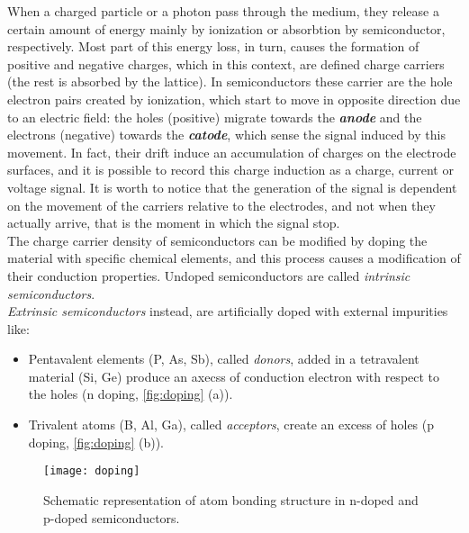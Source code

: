 When a charged particle or a photon pass through the medium, they release a certain amount of energy mainly by ionization or absorbtion by semiconductor, respectively. Most part of this energy loss, in turn, causes the formation of positive and negative charges, which in this context, are defined charge carriers (the rest is absorbed by the lattice). In semiconductors these carrier are the hole electron pairs created by ionization, which  start to move in opposite direction due to an electric field: the holes (positive) migrate towards the \textit{\textbf{anode}} and the electrons (negative) towards the \textit{\textbf{catode}}, which sense the signal induced by this movement. In fact, their drift induce an accumulation of charges on the electrode surfaces, and it is possible to record this charge induction as a charge, current or voltage signal. It is worth to notice that the generation of the signal is dependent on the movement of the carriers relative to the electrodes, and not when they actually arrive, that is the moment in which the signal stop.\\

The charge carrier density of semiconductors can be modified by doping the material with specific chemical elements, and this process causes a modification of their conduction properties.
Undoped semiconductors are called \emph{intrinsic semiconductors}. \\
\emph{Extrinsic semiconductors} instead, are artificially doped with external impurities like: 

\begin{itemize}
\item Pentavalent elements (P, As, Sb), called \emph{donors}, added in a tetravalent material (Si, Ge) produce an axecss of conduction electron with respect to the holes (n doping, \autoref{fig:doping} (a)).
\item Trivalent atoms (B, Al, Ga), called \emph{acceptors}, create an excess of holes (p doping, \autoref{fig:doping} (b)).
\end{itemize}

\begin{figure}[h!]
\centering
\texttt{[image: doping]}
\caption{Schematic representation of atom bonding structure in n-doped and p-doped semiconductors.}
\label{fig:doping}
\end{figure}


